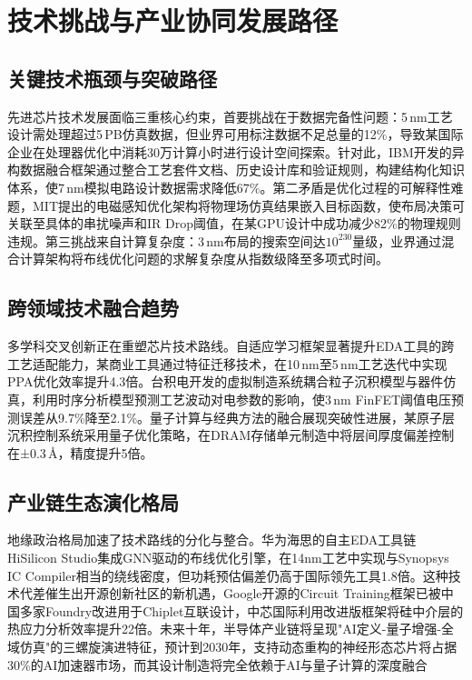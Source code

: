 \documentclass[12pt,hyperref,a4paper,UTF8]{ctexart}
\begin{document}
\section{技术挑战与产业协同发展路径}

\subsection{关键技术瓶颈与突破路径}
先进芯片技术发展面临三重核心约束，首要挑战在于数据完备性问题：5\,nm工艺设计需处理超过5\,PB仿真数据，但业界可用标注数据不足总量的12\%，导致某国际企业在处理器优化中消耗30万计算小时进行设计空间探索。针对此，IBM开发的异构数据融合框架通过整合工艺套件文档\cite{ibm2023cognitive}、历史设计库和验证规则，构建结构化知识体系，使7\,nm模拟电路设计数据需求降低67\%。第二矛盾是优化过程的可解释性难题，MIT提出的电磁感知优化架构将物理场仿真结果嵌入目标函数\cite{reda2023physics}，使布局决策可关联至具体的串扰噪声和IR Drop阈值，在某GPU设计中成功减少82\%的物理规则违规。第三挑战来自计算复杂度：3\,nm布局的搜索空间达$10^{230}$量级，业界通过混合计算架构将布线优化问题的求解复杂度从指数级降至多项式时间。

\subsection{跨领域技术融合趋势}
多学科交叉创新正在重塑芯片技术路线。自适应学习框架显著提升EDA工具的跨工艺适配能力，某商业工具通过特征迁移技术，在10\,nm至5\,nm工艺迭代中实现PPA优化效率提升4.3倍。台积电开发的虚拟制造系统耦合粒子沉积模型与器件仿真\cite{tsmc2023vlsit}，利用时序分析模型预测工艺波动对电参数的影响，使3\,nm FinFET阈值电压预测误差从9.7\%降至2.1\%。量子计算与经典方法的融合展现突破性进展，某原子层沉积控制系统采用量子优化策略，在DRAM存储单元制造中将层间厚度偏差控制在±0.3\,\AA，精度提升5倍。

\subsection{产业链生态演化格局}
地缘政治格局加速了技术路线的分化与整合。华为海思的自主EDA工具链HiSilicon Studio集成GNN驱动的布线优化引擎，在14nm工艺中实现与Synopsys IC Compiler相当的绕线密度，但功耗预估偏差仍高于国际领先工具1.8倍。这种技术代差催生出开源创新社区的新机遇，Google开源的Circuit Training框架已被中国多家Foundry改进用于Chiplet互联设计，中芯国际利用改进版框架将硅中介层的热应力分析效率提升22倍。未来十年，半导体产业链将呈现"AI定义-量子增强-全域仿真"的三螺旋演进特征，预计到2030年，支持动态重构的神经形态芯片将占据30\%的AI加速器市场，而其设计制造将完全依赖于AI与量子计算的深度融合
\end{document}
